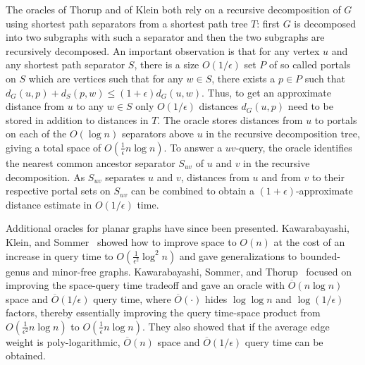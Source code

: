 \documentclass[11pt]{article}
\begin{document}
The oracles of Thorup and of Klein both rely on a recursive decomposition of $G$ using shortest path separators from a shortest path tree $T$: first $G$ is decomposed into two subgraphs with such a separator and then the two subgraphs are recursively decomposed. An important observation is that for any vertex $u$ and any shortest path separator $S$, there is a size $O(1/\epsilon)$ set $P$ of so called portals on $S$ which are vertices such that for any $w\in S$, there exists a $p\in P$ such that $d_G(u,p) + d_S(p,w)\leq (1+\epsilon)d_G(u,w)$. Thus, to get an approximate distance from $u$ to any $w\in S$ only $O(1/\epsilon)$ distances $d_G(u,p)$ need to be stored in addition to distances in $T$. The oracle stores distances from $u$ to portals on each of the $O(\log n)$ separators above $u$ in the recursive decomposition tree, giving a total space of $O(\frac 1 \epsilon n\log n)$. To answer a $uv$-query, the oracle identifies the nearest common ancestor separator $S_{uv}$ of $u$ and $v$ in the recursive decomposition. As $S_{uv}$ separates $u$ and $v$, distances from $u$ and from $v$ to their respective portal sets on $S_{uv}$ can be combined to obtain a $(1+\epsilon)$-approximate distance estimate in $O(1/\epsilon)$ time.

Additional oracles for planar graphs have since been presented. Kawarabayashi, Klein, and Sommer~\cite{LinSpaceOraclesPlanar} showed how to improve space to $O(n)$ at the cost of an increase in query time to $O(\frac 1{\epsilon^2}\log^2n)$ and gave generalizations to bounded-genus and minor-free graphs. Kawarabayashi, Sommer, and Thorup~\cite{CompactOraclesPlanar} focused on improving the space-query time tradeoff and gave an oracle with $\overline{O}(n\log n)$ space and $\overline{O}(1/\epsilon)$ query time, where $\overline{O}(\cdot)$ hides $\log\log n$ and $\log(1/\epsilon)$ factors, thereby essentially improving the query time-space product from $O(\frac 1{\epsilon^2}n\log n)$ to $O(\frac 1\epsilon n\log n)$. They also showed that if the average edge weight is poly-logarithmic, $\overline{O}(n)$ space and $\overline{O}(1/\epsilon)$ query time can be obtained.
\end{document}
